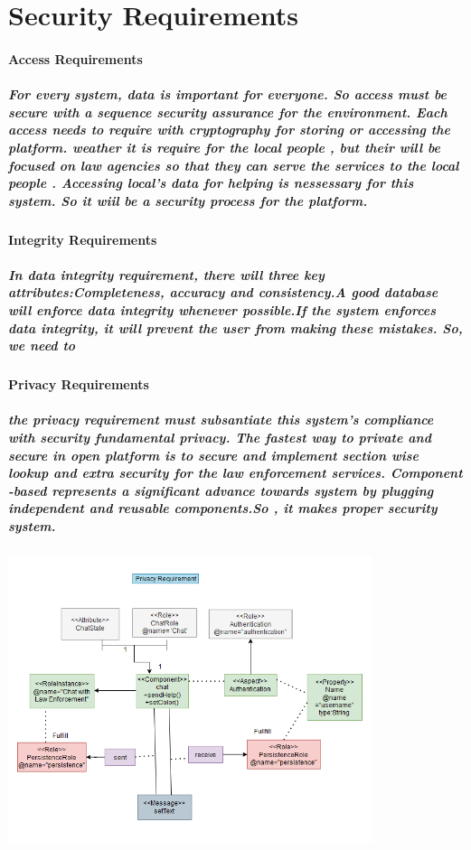 \documentclass{article}
\begin{document}
\section{Security Requirements}

\paragraph{Access Requirements}
\subparagraph{For every system, data is important for everyone. So access must be secure with a sequence security assurance for the environment.
Each access needs to require with cryptography for storing or accessing the platform. weather it is require for the local people , but their will be focused on law agencies so that they can serve the services
to the local people . Accessing local's data for helping is nessessary for this system. So it wiil be a security process for the platform.
}
\paragraph{Integrity Requirements}
\subparagraph{In data integrity requirement, there will three key attributes:Completeness, accuracy and consistency.A good database will enforce data integrity whenever possible.If the system enforces data integrity, it will prevent the user from making these mistakes.
So, we need to }
\paragraph{Privacy Requirements}
\subparagraph{the privacy requirement must subsantiate this system's compliance with security fundamental privacy.
The fastest way to private and secure in open platform is to secure and implement section wise lookup and extra security for the law enforcement services.
Component -based represents a significant advance towards system by plugging independent and reusable components.So , it makes proper security system.}
\includegraphics[width=0.8\textwidth]{Privacy_Requirement.png}
\end{document}

